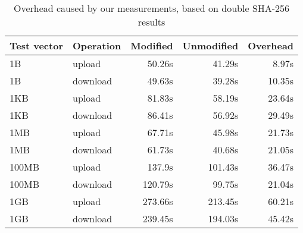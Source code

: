 \begin{table}
  \centering
  \caption{Overhead caused by our measurements, based on double \ac{SHA}-256
    results}
  \begin{tabular}{ | l | l | r | r | r |}
    \hline
    \textbf{Test vector} & \textbf{Operation} & \textbf{Modified} & \textbf{Unmodified} & \textbf{Overhead} \\ \hline
    1B     &  upload    &  50.26s   &  41.29s   &  8.97s   \\  \hline
    1B     &  download  &  49.63s   &  39.28s   &  10.35s  \\  \hline
    1KB    &  upload    &  81.83s   &  58.19s   &  23.64s  \\  \hline
    1KB    &  download  &  86.41s   &  56.92s   &  29.49s  \\  \hline
    1MB    &  upload    &  67.71s   &  45.98s   &  21.73s  \\  \hline
    1MB    &  download  &  61.73s   &  40.68s   &  21.05s  \\  \hline
    100MB  &  upload    &  137.9s   &  101.43s  &  36.47s  \\  \hline
    100MB  &  download  &  120.79s  &  99.75s   &  21.04s  \\  \hline
    1GB    &  upload    &  273.66s  &  213.45s  &  60.21s  \\  \hline
    1GB    &  download  &  239.45s  &  194.03s  &  45.42s  \\  \hline
  \end{tabular}
  \label{tbl:measure:overhead}
\end{table}
